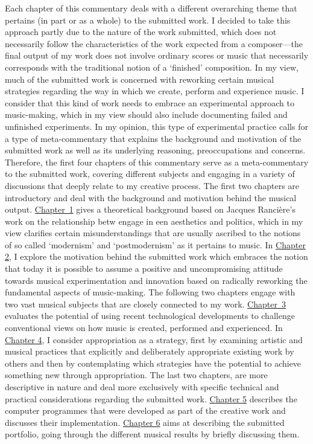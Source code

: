 Each chapter of this commentary deals with a different overarching theme that pertains (in part or as a whole) to the submitted work. I decided to take this approach partly due to the nature of the work submitted, which does not necessarily follow the characteristics of the work expected from a composer---the final output of my work does not involve ordinary scores or music that necessarily corresponds with the traditional notion of a `finished' composition. In my view, much of the submitted work is concerned with reworking certain musical strategies regarding the way in which we create, perform and experience music. I consider that this kind of work needs to embrace an experimental approach to music-making, which in my view should also include documenting failed and unfinished experiments. In my opinion, this type of experimental practice calls for a type of meta-commentary that explains the background and motivation of the submitted work as well as its underlying reasoning, preoccupations and concerns. Therefore, the first four chapters of this commentary serve as a meta-commentary to the submitted work, covering different subjects and engaging in a variety of discussions that deeply relate to my creative process. The first two chapters are introductory and deal with the background and motivation behind the musical output. \hyperlink{chapter1}{\mbox{Chapter 1}} gives a theoretical background based on Jacques Ranci\`{e}re's work on the relationship betw engage in een aesthetics and politics, which in my view clarifies certain misunderstandings that are usually ascribed to the notions of so called `modernism' and `postmodernism' as it pertains to music. In \hyperlink{chapter2}{Chapter 2}, I explore the motivation behind the submitted work which embraces the notion that today it is possible to assume a positive and uncompromising attitude towards musical experimentation and innovation based on radically reworking the fundamental aspects of music-making. The following two chapters engage with two vast musical subjects that are closely connected to my work. \hyperlink{chapter3}{\mbox{Chapter 3}} evaluates the potential of using recent technological developments to challenge conventional views on how music is created, performed and experienced. In \hyperlink{chapter4}{Chapter 4}, I consider appropriation as a strategy, first by examining artistic and musical practices that explicitly and deliberately appropriate existing work by others and then by contemplating which strategies have the potential to achieve something new through appropriation. The last two chapters, are more descriptive in nature and deal more exclusively with specific technical and practical considerations regarding the submitted work. \hyperlink{chapter5}{Chapter 5} describes the computer programmes that were developed as part of the creative work and discusses their implementation. \hyperlink{chapter6}{Chapter 6} aims at describing the submitted portfolio, going through the different musical results by briefly discussing them.

